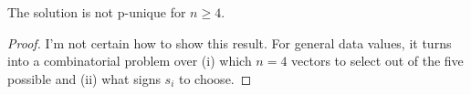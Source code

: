 \begin{conjecture}
	The solution is not p-unique for \( n \geq 4 \).
\end{conjecture}
\begin{proof}
	I'm not certain how to show this result.
	For general data values, it turns into a combinatorial problem over (i)
	which $n = 4$ vectors to select out of the five possible and (ii) what
	signs $s_i$ to choose.
\end{proof}

\begin{lemma}
    
\end{lemma}





